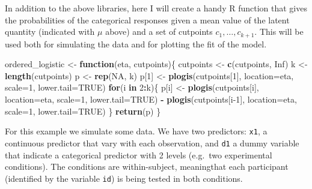 \documentclass[
]{book}
\newenvironment{Shaded}{\begin{snugshade}}{\end{snugshade}}
\newcommand{\AttributeTok}[1]{\textcolor[rgb]{0.13,0.29,0.53}{#1}}
\newcommand{\ConstantTok}[1]{\textcolor[rgb]{0.56,0.35,0.01}{#1}}
\newcommand{\ControlFlowTok}[1]{\textcolor[rgb]{0.13,0.29,0.53}{\textbf{#1}}}
\newcommand{\DecValTok}[1]{\textcolor[rgb]{0.00,0.00,0.81}{#1}}
\newcommand{\FunctionTok}[1]{\textcolor[rgb]{0.13,0.29,0.53}{\textbf{#1}}}
\newcommand{\NormalTok}[1]{#1}
\newcommand{\OtherTok}[1]{\textcolor[rgb]{0.56,0.35,0.01}{#1}}
\newcommand{\SpecialCharTok}[1]{\textcolor[rgb]{0.81,0.36,0.00}{\textbf{#1}}}
\begin{document}
In addition to the above libraries, here I will create a handy R function that gives the probabilities of the categorical responses given a mean value of the latent quantity (indicated with \(\mu\) above) and a set of cutpoints \(c_1, \ldots, c_{k+1}\). This will be used both for simulating the data and for plotting the fit of the model.

\begin{Shaded}
\begin{Highlighting}[]
\NormalTok{ordered\_logistic }\OtherTok{\textless{}{-}} \ControlFlowTok{function}\NormalTok{(eta, cutpoints)\{}
\NormalTok{  cutpoints }\OtherTok{\textless{}{-}} \FunctionTok{c}\NormalTok{(cutpoints, }\ConstantTok{Inf}\NormalTok{)}
\NormalTok{  k }\OtherTok{\textless{}{-}} \FunctionTok{length}\NormalTok{(cutpoints)}
\NormalTok{  p }\OtherTok{\textless{}{-}} \FunctionTok{rep}\NormalTok{(}\ConstantTok{NA}\NormalTok{, k)}
\NormalTok{  p[}\DecValTok{1}\NormalTok{] }\OtherTok{\textless{}{-}} \FunctionTok{plogis}\NormalTok{(cutpoints[}\DecValTok{1}\NormalTok{], }\AttributeTok{location=}\NormalTok{eta, }\AttributeTok{scale=}\DecValTok{1}\NormalTok{, }\AttributeTok{lower.tail=}\ConstantTok{TRUE}\NormalTok{)}
  \ControlFlowTok{for}\NormalTok{(i }\ControlFlowTok{in} \DecValTok{2}\SpecialCharTok{:}\NormalTok{k)\{}
\NormalTok{    p[i] }\OtherTok{\textless{}{-}} \FunctionTok{plogis}\NormalTok{(cutpoints[i], }\AttributeTok{location=}\NormalTok{eta, }\AttributeTok{scale=}\DecValTok{1}\NormalTok{, }\AttributeTok{lower.tail=}\ConstantTok{TRUE}\NormalTok{) }\SpecialCharTok{{-}} 
      \FunctionTok{plogis}\NormalTok{(cutpoints[i}\DecValTok{{-}1}\NormalTok{], }\AttributeTok{location=}\NormalTok{eta, }\AttributeTok{scale=}\DecValTok{1}\NormalTok{, }\AttributeTok{lower.tail=}\ConstantTok{TRUE}\NormalTok{)}
\NormalTok{  \}}
  \FunctionTok{return}\NormalTok{(p)}
\NormalTok{\}}
\end{Highlighting}
\end{Shaded}

For this example we simulate some data. We have two predictors: \texttt{x1}, a continuous predictor that vary with each observation, and \texttt{d1} a dummy variable that indicate a categorical predictor with 2 levels (e.g.~two experimental conditions). The conditions are within-subject, meaningthat each participant (identified by the variable \texttt{id}) is being tested in both conditions.
\end{document}

